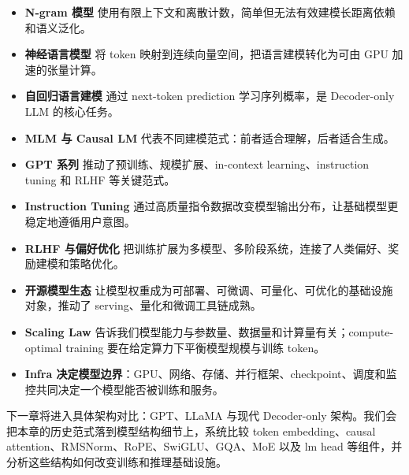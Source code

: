 \begin{itemize}
\item \textbf{N-gram 模型} 使用有限上下文和离散计数，简单但无法有效建模长距离依赖和语义泛化。
\item \textbf{神经语言模型} 将 token 映射到连续向量空间，把语言建模转化为可由 GPU 加速的张量计算。
\item \textbf{自回归语言建模} 通过 next-token prediction 学习序列概率，是 Decoder-only LLM 的核心任务。
\item \textbf{MLM 与 Causal LM} 代表不同建模范式：前者适合理解，后者适合生成。
\item \textbf{GPT 系列} 推动了预训练、规模扩展、in-context learning、instruction tuning 和 RLHF 等关键范式。
\item \textbf{Instruction Tuning} 通过高质量指令数据改变模型输出分布，让基础模型更稳定地遵循用户意图。
\item \textbf{RLHF 与偏好优化} 把训练扩展为多模型、多阶段系统，连接了人类偏好、奖励建模和策略优化。
\item \textbf{开源模型生态} 让模型权重成为可部署、可微调、可量化、可优化的基础设施对象，推动了 serving、量化和微调工具链成熟。
\item \textbf{Scaling Law} 告诉我们模型能力与参数量、数据量和计算量有关；compute-optimal training 要在给定算力下平衡模型规模与训练 token。
\item \textbf{Infra 决定模型边界}：GPU、网络、存储、并行框架、checkpoint、调度和监控共同决定一个模型能否被训练和服务。
\end{itemize}

下一章将进入具体架构对比：GPT、LLaMA 与现代 Decoder-only 架构。我们会把本章的历史范式落到模型结构细节上，系统比较 token embedding、causal attention、RMSNorm、RoPE、SwiGLU、GQA、MoE 以及 lm head 等组件，并分析这些结构如何改变训练和推理基础设施。
